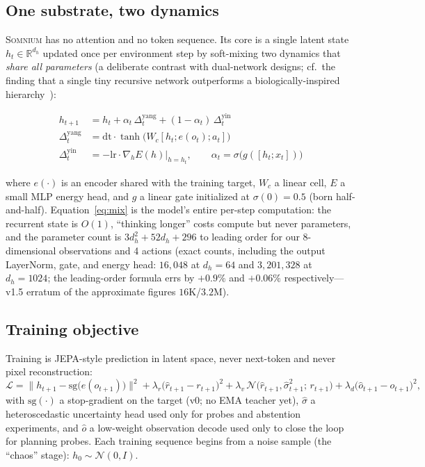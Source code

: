 \documentclass[11pt,a4paper]{article}
\newcommand{\som}{\textsc{Somnium}}
\begin{document}
\subsection{One substrate, two dynamics}

\som{} has no attention and no token sequence. Its core is a single latent state $h_t \in \mathbb{R}^{d_h}$ updated once per environment step by soft-mixing two dynamics that \emph{share all parameters} (a deliberate contrast with dual-network designs; cf.\ the finding that a single tiny recursive network outperforms a biologically-inspired hierarchy~\cite{jolicoeur2025}):

\begin{align}
h_{t+1} &= h_t + \alpha_t\,\Delta^{\text{yang}}_t + (1-\alpha_t)\,\Delta^{\text{yin}}_t \label{eq:mix}\\
\Delta^{\text{yang}}_t &= \mathrm{dt}\cdot\tanh\!\big(W_c [h_t; e(o_t); a_t]\big) \label{eq:yang}\\
\Delta^{\text{yin}}_t &= -\mathrm{lr}\cdot\nabla_{h} E(h)\big|_{h=h_t}, \qquad \alpha_t = \sigma\!\big(g([h_t; x_t])\big) \label{eq:yin}
\end{align}

\noindent where $e(\cdot)$ is an encoder shared with the training target, $W_c$ a linear cell, $E$ a small MLP energy head, and $g$ a linear gate initialized at $\sigma(0)=0.5$ (born half-and-half). Equation~\eqref{eq:mix} is the model's entire per-step computation: the recurrent state is $O(1)$, ``thinking longer'' costs compute but never parameters, and the parameter count is $3d_h^2 + 52d_h + 296$ to leading order for our 8-dimensional observations and 4 actions (exact counts, including the output LayerNorm, gate, and energy head: $16{,}048$ at $d_h{=}64$ and $3{,}201{,}328$ at $d_h{=}1024$; the leading-order formula errs by $+0.9\%$ and $+0.06\%$ respectively---v1.5 erratum of the approximate figures $16$K/$3.2$M).

\subsection{Training objective}

Training is JEPA-style prediction in latent space, never next-token and never pixel reconstruction:
\begin{equation}
\mathcal{L} = \big\|h_{t+1} - \mathrm{sg}\big(e(o_{t+1})\big)\big\|^2
+ \lambda_r \big(\hat r_{t+1} - r_{t+1}\big)^2
+ \lambda_v \, \mathcal{N}\!\big(\hat r_{t+1}, \hat\sigma^2_{t+1};\, r_{t+1}\big)
+ \lambda_d \big(\hat o_{t+1} - o_{t+1}\big)^2 ,
\label{eq:loss}
\end{equation}
with $\mathrm{sg}(\cdot)$ a stop-gradient on the target (v0; no EMA teacher yet), $\hat\sigma$ a heteroscedastic uncertainty head used only for probes and abstention experiments, and $\hat o$ a low-weight observation decode used only to close the loop for planning probes. Each training sequence begins from a noise sample (the ``chaos'' stage): $h_0 \sim \mathcal{N}(0, I)$.
\end{document}
